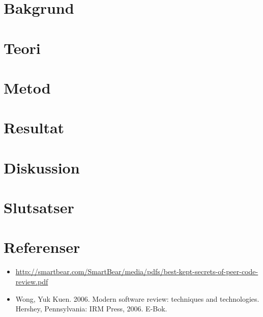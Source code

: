 \documentclass{article}
\begin{document}
\section{Bakgrund}
\section{Teori}
\section{Metod}
\section{Resultat}
\section{Diskussion}
\section{Slutsatser}


\clearpage
\section{Referenser}
\begin{itemize}
\item \url{http://smartbear.com/SmartBear/media/pdfs/best-kept-secrets-of-peer-code-review.pdf}
\item Wong, Yuk Kuen. 2006. Modern software review: techniques and technologies. Hershey, Pennsylvania: IRM Press, 2006. E-Bok.
\end{itemize}

\nocite{*}
{}

\end{document}
